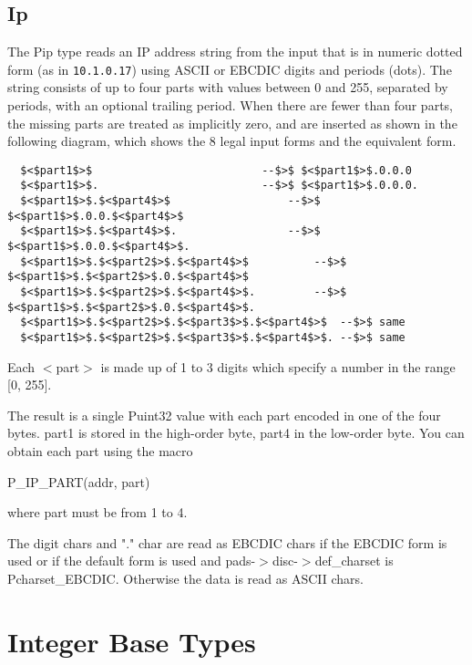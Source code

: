 \subsection{Ip}

\aedBegin{}
\aedEnd{}

The Pip type reads an IP address string from the input that is in
numeric dotted form (as in {\tt 10.1.0.17}) using ASCII or EBCDIC
digits and periods (dots).  The string consists of up to four
parts with values between 0 and 255, separated by periods,
with an optional trailing period.  When there are
fewer than four parts, the missing parts are treated as implicitly
zero, and are inserted as shown in the following diagram,
which shows the 8 legal input forms and the equivalent form.
\begin{verbatim}
  $<$part1$>$                          --$>$ $<$part1$>$.0.0.0
  $<$part1$>$.                         --$>$ $<$part1$>$.0.0.0.
  $<$part1$>$.$<$part4$>$                  --$>$ $<$part1$>$.0.0.$<$part4$>$
  $<$part1$>$.$<$part4$>$.                 --$>$ $<$part1$>$.0.0.$<$part4$>$.
  $<$part1$>$.$<$part2$>$.$<$part4$>$          --$>$ $<$part1$>$.$<$part2$>$.0.$<$part4$>$
  $<$part1$>$.$<$part2$>$.$<$part4$>$.         --$>$ $<$part1$>$.$<$part2$>$.0.$<$part4$>$.
  $<$part1$>$.$<$part2$>$.$<$part3$>$.$<$part4$>$  --$>$ same
  $<$part1$>$.$<$part2$>$.$<$part3$>$.$<$part4$>$. --$>$ same
\end{verbatim}
Each $<$part$>$ is made up of 1 to 3 digits which specify a number
in the range [0, 255].

The result is a single Puint32 value with each part encoded in one
of the four bytes.  part1 is stored in the high-order byte, part4
in the low-order byte.  You can obtain each part using the macro

\begin{tinycodeaux}{\leftmargin=0in}
  P\_IP\_PART(addr, part)
\end{tinycodeaux}
where part must be from 1 to 4.

The digit chars and "." char are read as EBCDIC chars if the EBCDIC
form is used or if the default form is used and
pads-$>$disc-$>$def\_charset is Pcharset\_EBCDIC.  Otherwise the data is
read as ASCII chars.

\section{Integer Base Types}

